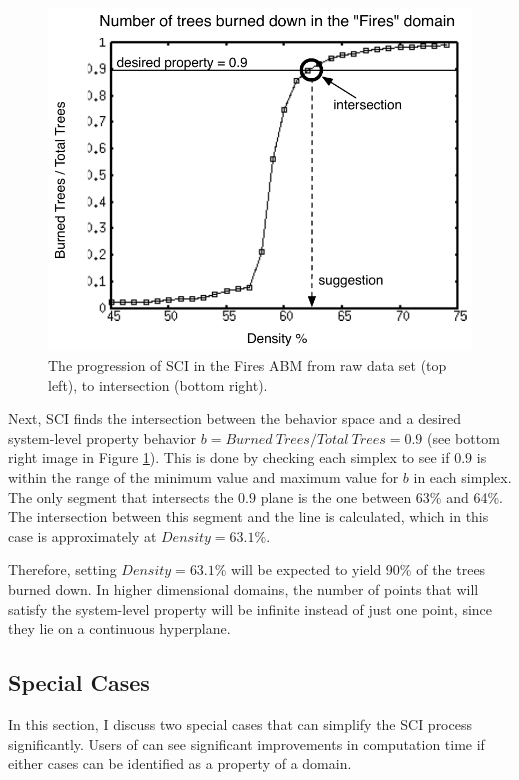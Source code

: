 \begin{figure}[ht]
\includegraphics[scale=.5]{images/rii5.pdf}
\caption{The progression of SCI in the Fires ABM from raw data set (top left), to intersection (bottom right). }
\label{fig:rii}
\end{figure}

Next, SCI finds the intersection between the behavior space and a desired system-level property behavior $b = Burned~{ }Trees / Total~{ }Trees = 0.9$ (see bottom right image in Figure \ref{fig:rii}).
This is done by checking each simplex to see if $0.9$ is within the range of the minimum value and maximum value for $b$ in each simplex.
The only segment that intersects the $0.9$ plane is the one between 63\% and 64\%.
The intersection between this segment and the line is calculated, which in this case is approximately at $Density = 63.1$\%.

Therefore, setting $Density = 63.1$\% will be expected to yield 90\% of the trees burned down.
In higher dimensional domains, the number of points that will satisfy the system-level property will be infinite instead of just one point, since they lie on a continuous hyperplane.

\subsection{Special Cases}

In this section, I discuss two special cases that can simplify the SCI process significantly.
Users of \fw can see significant improvements in computation time if either cases can be identified as a property of a domain.

